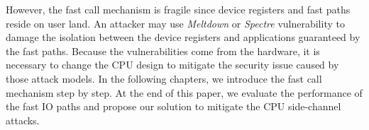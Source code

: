 However, the fast call mechanism is fragile since device registers and fast paths reside on user land. 
An attacker may use \emph{Meltdown}\cite{1} or \emph{Spectre}\cite{3} vulnerability to damage the isolation between the device registers 
and applications guaranteed by the fast paths. Because the vulnerabilities come from the hardware, it is 
necessary to change the CPU design to mitigate the security issue caused by those attack models. In the 
following chapters, we introduce the fast call mechanism step by step. At the end of this paper, we 
evaluate the performance of the fast IO paths and propose our solution to mitigate the CPU side-channel attacks.
\cleardoublepage

